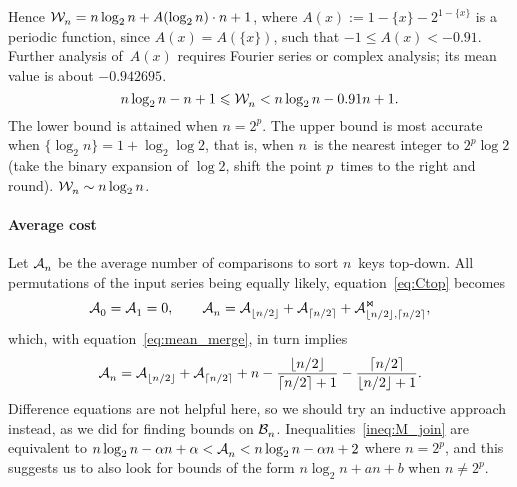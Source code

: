Hence \(\mathcal{W}_{n}^{} = n\log_2 n + A(\log_2 n) \cdot n + 1\), where \(A(x) := 1 -
\{x\} - 2^{1 - \{x\}}\) is a periodic function, since \(A(x) =
A(\{x\})\), such that \(-1 \leqslant A(x) < -0.91\). Further analysis
of~\(A(x)\) requires Fourier series or complex analysis; its mean
value is about \(-0.942695\).
\begin{equation}
n\log_2 n - n + 1 \leqslant \mathcal{W}_{n}^{} <
n\log_2 n - 0.91 n + 1.\label{ineq:OWtms}
\end{equation}
The lower bound is attained when \(n=2^p\). The upper bound is most
accurate when \(\{\log_2 n\} = 1 + \log_2\log 2\), that is, when \(n\)~is the
nearest integer to \(2^p\log 2\) (take the binary expansion of \(\log
2\), shift the point \(p\)~times to the right and round). \(\mathcal{W}_{n}^{}
\sim n\log_2 n\).

\paragraph{Average cost}

Let \(\mathcal{A}_{n}^{}\) be the average number of comparisons to sort
\(n\)~keys top\hyp{}down. All permutations of the input series being
equally likely, equation~\eqref{eq:Ctop} becomes
\begin{equation*}
\mathcal{A}_{0}^{} = \mathcal{A}_{1}^{} = 0,\qquad
\mathcal{A}_{n}^{} = \mathcal{A}_{\lfloor{n/2}\rfloor}^{} +
\mathcal{A}_{\lceil{n/2}\rceil}^{} +
\mathcal{A}_{\lfloor{n/2}\rfloor,\lceil{n/2}\rceil}^{\Join},
\end{equation*} 
which, with equation~\eqref{eq:mean_merge}, in turn implies
\begin{equation}
\mathcal{A}_{n}^{} = \mathcal{A}_{\lfloor{n/2}\rfloor}^{} +
\mathcal{A}_{\lceil{n/2}\rceil}^{} + n -
\frac{\lfloor{n/2}\rfloor}{\lceil{n/2}\rceil+1} 
- \frac{\lceil{n/2}\rceil}{\lfloor{n/2}\rfloor+1}.
\label{eq:Mn}
\end{equation}
Difference equations are not helpful here, so we should try an
inductive approach instead, as we did for finding bounds on
\(\mathcal{B}_{n}^{}\). Inequalities~\eqref{ineq:M_join} are equivalent to \(n\log_2
n - \alpha n + \alpha < \mathcal{A}_{n}^{} < n\log_2 n - \alpha n + 2\) where \(n =
2^p\), and this suggests us to also look for bounds of the form \(n\log_2
n + an + b\) when \(n \neq 2^p\).

